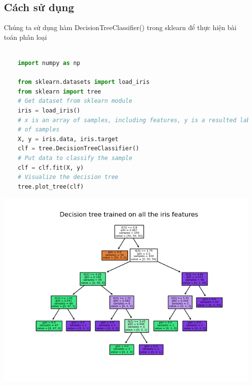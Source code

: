 \documentclass[lineno]{biometrika}
\begin{document}
\subsection{Cách sử dụng}\label{Using}
Chúng ta sử dụng hàm DecisionTreeClassifier() trong sklearn để thực hiện bài toán phân loại 
    \begin{lstlisting}[language=Python]
    
    import numpy as np
    
    from sklearn.datasets import load_iris
    from sklearn import tree
    # Get dataset from sklearn module
    iris = load_iris()  
    # x is an array of samples, including features, y is a resulted label 
    # of samples
    X, y = iris.data, iris.target  
    clf = tree.DecisionTreeClassifier() 
    # Put data to classify the sample
    clf = clf.fit(X, y)             
    # Visualize the decision tree
    tree.plot_tree(clf)
    \end{lstlisting}
    \includegraphics{Datatree}
    
    
    
\end{document}

